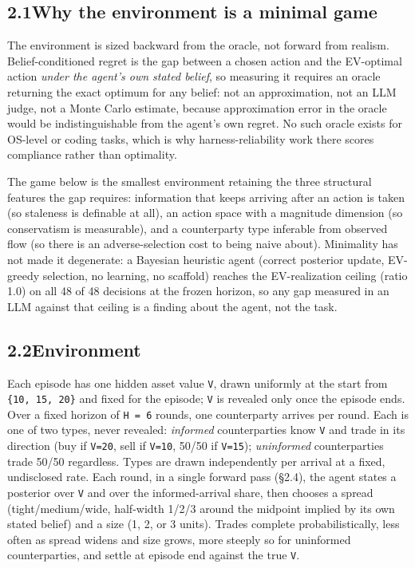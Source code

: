 \documentclass[
  10pt,
]{article}
\begin{document}
\subsection{2.1\quad Why the environment is a minimal game}\label{why-the-environment-is-a-minimal-game}

The environment is sized backward from the oracle, not forward from realism. Belief-conditioned regret is the gap between a chosen action and the EV-optimal action \emph{under the agent's own stated belief}, so measuring it requires an oracle returning the exact optimum for any belief: not an approximation, not an LLM judge, not a Monte Carlo estimate, because approximation error in the oracle would be indistinguishable from the agent's own regret. No such oracle exists for OS-level or coding tasks, which is why harness-reliability work there scores compliance rather than optimality.

The game below is the smallest environment retaining the three structural features the gap requires: information that keeps arriving after an action is taken (so staleness is definable at all), an action space with a magnitude dimension (so conservatism is measurable), and a counterparty type inferable from observed flow (so there is an adverse-selection cost to being naive about). Minimality has not made it degenerate: a Bayesian heuristic agent (correct posterior update, EV-greedy selection, no learning, no scaffold) reaches the EV-realization ceiling (ratio 1.0) on all 48 of 48 decisions at the frozen horizon, so any gap measured in an LLM against that ceiling is a finding about the agent, not the task.

\subsection{2.2\quad Environment}\label{environment}

Each episode has one hidden asset value \texttt{V}, drawn uniformly at the start from \texttt{\{10,\ 15,\ 20\}} and fixed for the episode; \texttt{V} is revealed only once the episode ends. Over a fixed horizon of \texttt{H\ =\ 6} rounds, one counterparty arrives per round. Each is one of two types, never revealed: \emph{informed} counterparties know \texttt{V} and trade in its direction (buy if \texttt{V=20}, sell if \texttt{V=10}, 50/50 if \texttt{V=15}); \emph{uninformed} counterparties trade 50/50 regardless. Types are drawn independently per arrival at a fixed, undisclosed rate. Each round, in a single forward pass (§2.4), the agent states a posterior over \texttt{V} and over the informed-arrival share, then chooses a spread (tight/medium/wide, half-width 1/2/3 around the midpoint implied by its own stated belief) and a size (1, 2, or 3 units). Trades complete probabilistically, less often as spread widens and size grows, more steeply so for uninformed counterparties, and settle at episode end against the true \texttt{V}.
\end{document}
